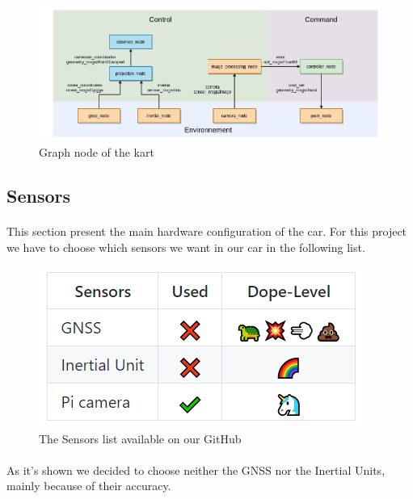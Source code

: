 \begin{figure}[!ht]
    \begin{center}
        \includegraphics[scale=0.4]{Images/node_graph.png}
    \end{center}
    \caption{Graph node of the kart}
    \label{fig:graphnode}
\end{figure}

\subsection{Sensors}

\paragraph{}This section present the main hardware configuration of the car. 
For this project we have to choose which sensors we want in our 
car in the following list.

\begin{figure}[!ht]
    \begin{center}
        \includegraphics[scale=0.6]{Images/Sensors.png}
    \end{center}
    \caption{The Sensors list available on our GitHub}
    \label{fig:sensors}
\end{figure}

\paragraph{}
As it's shown we decided to choose neither the GNSS nor the Inertial 
Units, mainly because of their accuracy.

